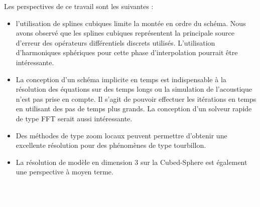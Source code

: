 Les perspectives de ce travail sont les suivantes :
\begin{itemize}
\item l'utilisation de splines cubiques limite la montée en ordre du schéma. Nous avons observé que les splines cubiques représentent la principale source d'erreur des opérateurs différentiels discrets utilisés. L'utilisation d'harmoniques sphériques pour cette phase d'interpolation pourrait être intéressante.
\item La conception d'un schéma implicite en temps est indispensable à la résolution des équations sur des temps longs ou la simulation de l’acoustique n'est pas prise en compte. Il s'agit de pouvoir effectuer les itérations en temps en utilisant des pas de temps plus grands. La conception d'un solveur rapide de type FFT serait aussi intéressante.
\item Des méthodes de type zoom locaux peuvent permettre d'obtenir une excellente résolution pour des phénomènes de type tourbillon.
\item La résolution de modèle en dimension 3 sur la Cubed-Sphere est également une perspective à moyen terme.
\end{itemize}

\textcolor{white}{
\begin{flushright}
\textit{"Nous tombons pour mieux apprendre à nous relever.",}
Batman Begins (2005), Christopher Nolan.
\end{flushright}
}

